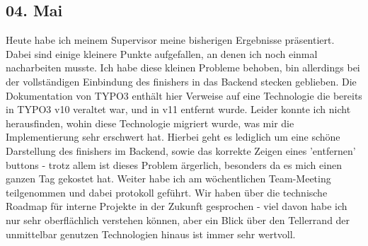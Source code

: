 \subsection{04. Mai}
Heute habe ich meinem Supervisor meine bisherigen Ergebnisse präsentiert. Dabei sind einige kleinere Punkte aufgefallen, an denen ich noch einmal nacharbeiten musste. Ich habe diese kleinen Probleme behoben, bin allerdings bei der vollständigen Einbindung des finishers in das Backend stecken geblieben. Die Dokumentation von TYPO3 enthält hier Verweise auf eine Technologie die bereits in TYPO3 v10 veraltet war, und in v11 entfernt wurde. Leider konnte ich nicht herausfinden, wohin diese Technologie migriert wurde, was mir die Implementierung sehr erschwert hat. Hierbei geht es lediglich um eine schöne Darstellung des finishers im Backend, sowie das korrekte Zeigen eines 'entfernen' buttons - trotz allem ist dieses Problem ärgerlich, besonders da es mich einen ganzen Tag gekostet hat.
Weiter habe ich am wöchentlichen Team-Meeting teilgenommen und dabei protokoll geführt. Wir haben über die technische Roadmap für interne Projekte in der Zukunft gesprochen - viel davon habe ich nur sehr oberflächlich verstehen können, aber ein Blick über den Tellerrand der unmittelbar genutzen Technologien hinaus ist immer sehr wertvoll.